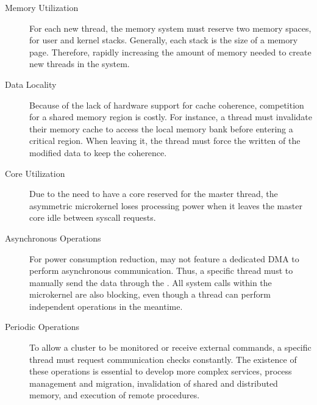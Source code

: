 	\begin{description}
		\item[Memory Utilization] For each new thread, the memory
			system must reserve two memory spaces, for user and kernel stacks.
			Generally, each stack is the size of a memory page. Therefore,
			rapidly increasing the amount of memory needed to create new
			threads in the system.

		\item[Data Locality] Because of the lack of hardware support for cache
			coherence, competition for a shared memory region is costly. For
			instance, a thread must invalidate their memory cache to access the
			local memory bank before entering a critical region. When leaving
			it, the thread must force the written of the modified data to keep
			the coherence.

		\item[Core Utilization] Due to the need to have a core reserved for the
			master thread, the asymmetric microkernel loses processing power
			when it leaves the master core idle between syscall requests.

		\item[Asynchronous Operations] For power consumption reduction, \lws may
			not feature a dedicated DMA to perform asynchronous communication.
			Thus, a specific thread must to manually send the data through the
			\noc. All system calls within the microkernel are also blocking,
			even though a thread can perform independent operations in the
			meantime.

		\item[Periodic Operations] To allow a cluster to be monitored or
			receive external commands, a specific thread must request
			communication checks constantly. The existence of these operations
			is essential to develop more complex services, \eg process
			management and migration, invalidation of shared and distributed
			memory, and execution of remote procedures.
	\end{description}

